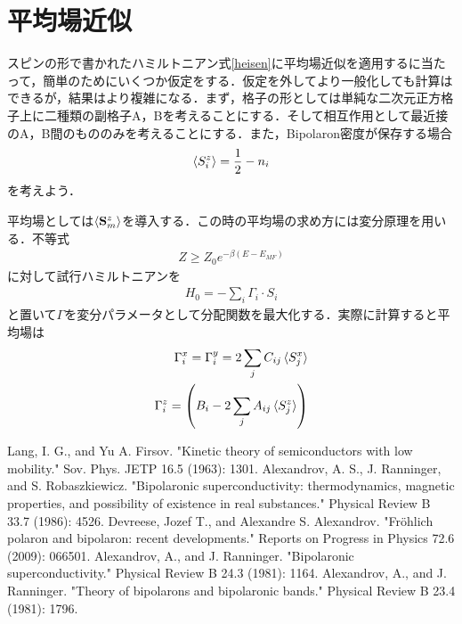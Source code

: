 \documentclass[a4j]{jarticle}
\begin{document}
\section{平均場近似}
スピンの形で書かれたハミルトニアン式\eqref{heisen}に平均場近似を適用するに当たって，簡単のためにいくつか仮定をする．仮定を外してより一般化しても計算はできるが，結果はより複雑になる．まず，格子の形としては単純な二次元正方格子上に二種類の副格子A，Bを考えることにする．そして相互作用として最近接のA，B間のもののみを考えることにする．また，Bipolaron密度が保存する場合
\begin{align*}
 \braket{S^z_i}=\frac{1}{2}-n_i
\end{align*}
を考えよう．

平均場としては$\braket{{\bf S}^z_m}$を導入する．この時の平均場の求め方には変分原理を用いる．不等式
\begin{align}
 Z \ge Z_0e^{-\beta (E-E_{MF})} 
\end{align}
に対して試行ハミルトニアンを
\begin{align*}
 H_0=-\sum_{i}\Gamma_i\cdot S_i
\end{align*}
と置いて$\Gamma$を変分パラメータとして分配関数を最大化する．実際に計算すると平均場は
\begin{align*}
 \Gamma^x_i=\Gamma^y_i=2\sum_{j}C_{ij}\braket{S^x_j} \\
 \Gamma^z_i=\left( B_i-2\sum_{j}A_{ij}\braket{S^z_j} \right)
\end{align*}








\begin{thebibliography}{9}
 Lang, I. G., and Yu A. Firsov. "Kinetic theory of semiconductors with low mobility." Sov. Phys. JETP 16.5 (1963): 1301.
 Alexandrov, A. S., J. Ranninger, and S. Robaszkiewicz. "Bipolaronic superconductivity: thermodynamics, magnetic properties, and possibility of existence in real substances." Physical Review B 33.7 (1986): 4526.
 Devreese, Jozef T., and Alexandre S. Alexandrov. "Fröhlich polaron and bipolaron: recent developments." Reports on Progress in Physics 72.6 (2009): 066501.
 Alexandrov, A., and J. Ranninger. "Bipolaronic superconductivity." Physical Review B 24.3 (1981): 1164.
 Alexandrov, A., and J. Ranninger. "Theory of bipolarons and bipolaronic bands." Physical Review B 23.4 (1981): 1796.



\end{thebibliography}
\end{document}
